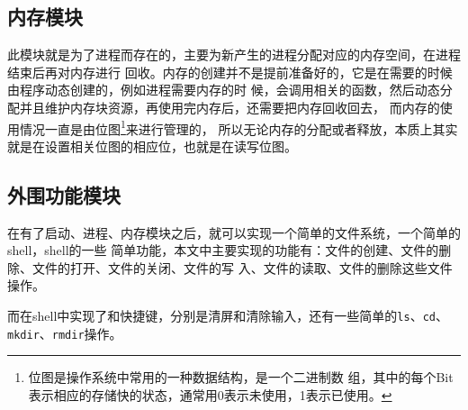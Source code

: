 \subsection{内存模块}

此模块就是为了进程而存在的，主要为新产生的进程分配对应的内存空间，在进程结束后再对内存进行
回收。内存的创建并不是提前准备好的，它是在需要的时候由程序动态创建的，例如进程需要内存的时
候，会调用相关的函数，然后动态分配并且维护内存块资源，再使用完内存后，还需要把内存回收回去，
而内存的使用情况一直是由位图\footnote{位图是操作系统中常用的一种数据结构，是一个二进制数
  组，其中的每个Bit表示相应的存储快的状态，通常用0表示未使用，1表示已使用。}来进行管理的，
所以无论内存的分配或者释放，本质上其实就是在设置相关位图的相应位，也就是在读写位图。

\subsection{外围功能模块}

在有了启动、进程、内存模块之后，就可以实现一个简单的文件系统，一个简单的shell，shell的一些
简单功能，本文中主要实现的功能有：文件的创建、文件的删除、文件的打开、文件的关闭、文件的写
入、文件的读取、文件的删除这些文件操作。

而在shell中实现了和快捷键，分别是清屏和清除输入，还有一些简单的\texttt{ls}、\texttt{cd}、
\texttt{mkdir}、\texttt{rmdir}操作。 

